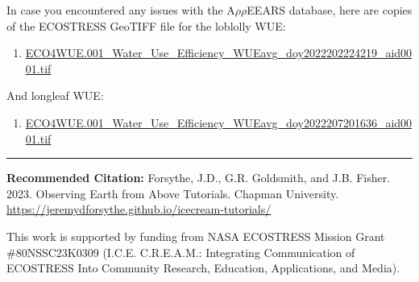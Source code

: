 \documentclass[oneside,a4paper,11pt,explicit]{book}
\begin{document}
\begin{tcolorbox}[colback=yellow!5!white,title=\textbf{Datafiles}]
	\large
	In case you encountered any issues with the A$\rho\rho$EEARS database, here are copies of the ECOSTRESS GeoTIFF file for the loblolly WUE:
	\begin{enumerate}
		\item \href{https://jeremydforsythe.github.io/icecream-tutorials/Tutorial7_Evapotranspiration2/ECO4WUE.001_Water_Use_Efficiency_WUEavg_doy2022202224219_aid0001.tif}{\small ECO4WUE.001\_Water\_Use\_Efficiency\_WUEavg\_doy2022202224219\_aid0001.tif}
	\end{enumerate}
	And longleaf WUE:
	\begin{enumerate}
		\item \href{https://jeremydforsythe.github.io/icecream-tutorials/Tutorial7_Evapotranspiration2/ECO4WUE.001_Water_Use_Efficiency_WUEavg_doy2022207201636_aid0001.tif}{\small ECO4WUE.001\_Water\_Use\_Efficiency\_WUEavg\_doy2022207201636\_aid0001.tif}
	\end{enumerate}
\end{tcolorbox}


\hrule

\vspace{1em}

\small \textbf{Recommended Citation:} Forsythe, J.D., G.R. Goldsmith, and J.B. Fisher. 2023. Observing Earth from Above Tutorials. Chapman University. \url{https://jeremydforsythe.github.io/icecream-tutorials/}

\vspace{1em}

This work is supported by funding from NASA ECOSTRESS Mission Grant \#80NSSC23K0309 (I.C.E. C.R.E.A.M.: Integrating Communication of ECOSTRESS Into Community Research, Education, Applications, and Media).
\end{document}

